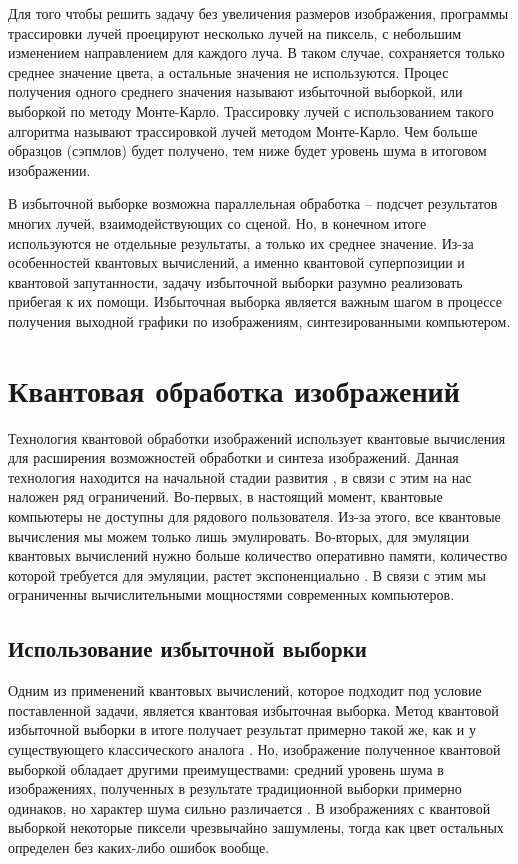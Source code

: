 Для того чтобы решить задачу без увеличения размеров изображения, программы трассировки лучей проецируют несколько лучей на пиксель, с небольшим изменением направлением для каждого луча. В таком случае, сохраняется только среднее значение цвета, а остальные значения не используются. Процес получения одного среднего значения называют избыточной выборкой, или выборкой по методу Монте-Карло. Трассировку лучей с использованием такого алгоритма называют трассировкой лучей методом Монте-Карло. Чем больше образцов (сэпмлов) будет получено, тем ниже будет уровень шума в итоговом изображении. 

В избыточной выборке возможна параллельная обработка -- подсчет результатов многих лучей, взаимодействующих со сценой. Но, в конечном итоге используются не отдельные результаты, а только их среднее значение. Из-за особенностей квантовых вычислений, а именно квантовой суперпозиции и квантовой запутанности, задачу избыточной выборки разумно реализовать прибегая к их помощи. Избыточная выборка является важным шагом в процессе получения выходной графики по изображениям, синтезированными компьютером.


\section{Квантовая обработка изображений}

Технология квантовой обработки изображений использует квантовые вычисления для расширения возможностей обработки и синтеза изображений. Данная технология находится на начальной стадии развития \cite{state}, в связи с этим на нас наложен ряд ограничений. Во-первых, в настоящий момент, квантовые компьютеры не доступны для рядового пользователя. Из-за этого, все квантовые вычисления мы можем только лишь эмулировать. Во-вторых, для эмуляции квантовых вычислений нужно больше количество оперативно памяти, количество которой требуется для эмуляции, растет экспоненциально \cite{emulating}. В связи с этим мы ограниченны вычислительными мощностями современных компьютеров.

\subsection{Использование избыточной выборки}

 Одним из применений квантовых вычислений, которое подходит под условие поставленной задачи, является квантовая избыточная выборка.
 Метод квантовой избыточной выборки в итоге получает результат примерно такой же, как и у существующего классического аналога \cite{PQC}. Но, изображение полученное квантовой выборкой обладает другими преимуществами: средний уровень шума в изображениях, полученных в результате традиционной выборки примерно одинаков, но характер шума сильно различается \cite{PQC}. В изображениях с квантовой выборкой некоторые пиксели чрезвычайно зашумлены, тогда как цвет остальных определен без каких-либо ошибок вообще.
 
